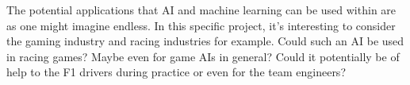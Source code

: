 The potential applications that AI and machine learning can be used within are as one might imagine endless. In this specific project, it's interesting to consider the gaming industry and racing industries for example. Could such an AI be used in racing games? Maybe even for game AIs in general? Could it potentially be of help to the F1 drivers during practice or even for the team engineers? 

